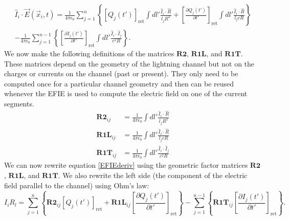 \documentclass{article}
\newcommand{\mat}{\mathbf}
\begin{document}
\begin{equation}
\label{EFIEderiv}
\begin{split}
\hat{I}_i\cdot\vec{E}(\vec{x}_i, t) = \frac{1}{4\pi\epsilon_0} \sum_{j=1}^n \left\{\left[Q_j(t')\right]_\text{ret} \int dl' \frac{\hat{I}_i\cdot\hat{R}}{l_jR^2} + \left[\frac{\partial Q_j(t')}{\partial t'}\right]_\text{ret} \int dl' \frac{\hat{I}_i\cdot\hat{R}}{l_jcR}\right\}\\
- \frac{1}{4\pi\epsilon_0} \sum_{j=1}^{n-1} \left\{\left[\frac{\partial I_j(t')}{\partial t'}\right]_\text{ret} \int dl' \frac{\hat{I}_i\cdot\hat{I}_j}{c^2R}\right\}.
\end{split}
\end{equation}
We now make the following definitions of the matrices $\mat{R2}$, $\mat{R1L}$, and $\mat{R1T}$. These matrices depend on the geometry of the lightning channel but not on the charges or currents on the channel (past or present). They only need to be computed once for a particular channel geometry and then can be reused whenever the EFIE is used to compute the electric field on one of the current segments.
\begin{align}
\label{R2}\mat{R2}_{ij} &= \frac{1}{4\pi\epsilon_0}\int dl' \frac{\hat{I}_i\cdot\hat{R}}{l_j R^2}\\
\label{R1L}\mat{R1L}_{ij} &= \frac{1}{4\pi\epsilon_0}\int dl' \frac{\hat{I}_i\cdot\hat{R}}{l_j c R}\\
\label{R1T}\mat{R1T}_{ij} &= \frac{1}{4\pi\epsilon_0}\int dl' \frac{\hat{I}_i\cdot\hat{I}_j}{c^2 R}
\end{align}
We can now rewrite equation \ref{EFIEderiv} using the geometric factor matrices $\mat{R2}$, $\mat{R1L}$, and $\mat{R1T}$. We also rewrite the left side (the component of the electric field parallel to the channel) using Ohm's law:
\begin{equation}
I_iR_l =
\sum_{j=1}^n \left\{\mat{R2}_{ij}\left[Q_j(t')\right]_\text{ret}
+ \mat{R1L}_{ij}\left[\frac{\partial Q_j(t')}{\partial t'}\right]_\text{ret}\right\}
- \sum_{j=1}^{n-1}\left\{\mat{R1T}_{ij}\left[\frac{\partial I_j(t')}{\partial t'}\right]_\text{ret}\right\}.
\end{equation}
\end{document}

